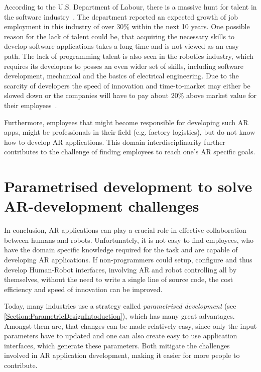 According to the U.S. Department of Labour, there is a massive hunt for talent in the software industry~\cite{blsGov}. The department reported an expected growth of job employment in this industry of over 30\% within the next 10 years. One possible reason for the lack of talent could be, that acquiring the necessary skills to develop software applications takes a long time and is not viewed as an easy path. The lack of programming talent is also seen in the robotics industry, which requires its developers to posses an even wider set of skills, including software development, mechanical and the basics of electrical engineering. Due to the scarcity of developers the speed of innovation and time-to-market may either be slowed down or the companies will have to pay about 20\% above market value for their employees~\cite{devShortageHackernoon}.

Furthermore, employees that might become responsible for developing such AR apps, might be professionals in their field (e.g. factory logistics), but do not know how to develop AR applications. This domain interdisciplinarity further contributes to the challenge of finding employees to reach one's AR specific goals. 

\section{Parametrised development to solve AR-development challenges}
\label{Section:PARRHIApproach}

In conclusion, AR applications can play a crucial role in effective collaboration between humans and robots. Unfortunately, it is not easy to find employees, who have  the domain specific knowledge required for the task and are capable of developing AR applications. If non-programmers could setup, configure and thus develop Human-Robot interfaces, involving AR and robot controlling all by themselves, without the need to write a single line of source code, the cost efficiency and speed of innovation can be improved.

Today, many industries use a strategy called \textit{parametrised development} (see \ref{Section:ParametricDesignIntoduction}), which has many great advantages. Amongst them are, that changes can be made relatively easy, since only the input parameters have to updated and one can also create easy to use application interfaces, which generate these parameters. Both mitigate the challenges involved in AR application development, making it easier for more people to contribute.


